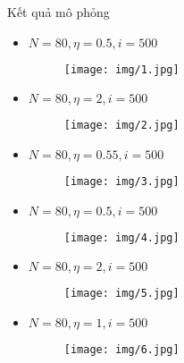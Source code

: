 \begin{frame}[allowframebreaks]{Kết quả mô phỏng}
\begin{itemize}
	\item $N = 80, \eta = 0.5, i = 500$
    \begin{figure}[H]
        \centering
        \texttt{[image: img/1.jpg]}
    \end{figure}
\end{itemize}
\break
\begin{itemize}
    \item $N = 80, \eta = 2, i = 500$
    \begin{figure}[H]
        \centering
        \texttt{[image: img/2.jpg]}
    \end{figure}
\end{itemize}
\break
\begin{itemize}
    \item $N = 80, \eta = 0.55, i = 500$
    \begin{figure}[H]
        \centering
        \texttt{[image: img/3.jpg]}
    \end{figure}
\end{itemize}
\break
\begin{itemize}
    \item $N = 80, \eta = 0.5, i = 500$
    \begin{figure}[H]
        \centering
        \texttt{[image: img/4.jpg]}
    \end{figure}
\end{itemize}
\break
\begin{itemize}
    \item $N = 80, \eta = 2, i = 500$
    \begin{figure}[H]
        \centering
        \texttt{[image: img/5.jpg]}
    \end{figure}
\end{itemize}
\break
\begin{itemize}
    \item $N = 80, \eta = 1, i = 500$
    \begin{figure}[H]
        \centering
        \texttt{[image: img/6.jpg]}
    \end{figure}
\end{itemize}
\end{frame}
